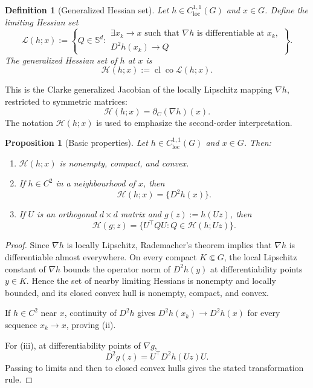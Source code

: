 \documentclass[11pt]{article}
\numberwithin{equation}{section}
\newtheorem{proposition}[theorem]{Proposition}
\newtheorem{definition}[theorem]{Definition}
\newcommand{\Sd}{\mathbb S^d}
\newcommand{\co}{\operatorname{co}}
\newcommand{\cl}{\operatorname{cl}}
\newcommand{\Hess}{\mathcal H}
\newcommand{\LimHess}{\mathcal L}
\begin{document}
	\begin{definition}[Generalized Hessian set]
		\label{def:hessian-set}
		Let \(h\in C^{1,1}_{\mathrm{loc}}(G)\) and \(x\in G\). Define the limiting Hessian set
		\[
		\LimHess(h;x)
		:=
		\left\{
		Q\in\Sd:
		\begin{array}{l}
			\exists x_k\to x \text{ such that } \nabla h \text{ is differentiable at }x_k,\\
			D^2h(x_k)\to Q
		\end{array}
		\right\}.
		\]
		The generalized Hessian set of \(h\) at \(x\) is
		\[
		\Hess(h;x)
		:=
		\cl\co \LimHess(h;x).
		\]
	\end{definition}
	
	This is the Clarke generalized Jacobian of the locally Lipschitz mapping \(\nabla h\), restricted to symmetric matrices:
	\[
	\Hess(h;x)=\partial_C(\nabla h)(x).
	\]
	The notation \(\Hess(h;x)\) is used to emphasize the second-order interpretation.
	
	\begin{proposition}[Basic properties]
		\label{prop:hessian-basic}
		Let \(h\in C^{1,1}_{\mathrm{loc}}(G)\) and \(x\in G\). Then:
		\begin{enumerate}[label=(\roman*)]
			\item \(\Hess(h;x)\) is nonempty, compact, and convex.
			\item If \(h\in C^2\) in a neighbourhood of \(x\), then
			\[
			\Hess(h;x)=\{D^2h(x)\}.
			\]
			\item If \(U\) is an orthogonal \(d\times d\) matrix and \(g(z):=h(Uz)\), then
			\[
			\Hess(g;z)
			=
			\{U^\top Q U: Q\in\Hess(h;Uz)\}.
			\]
		\end{enumerate}
	\end{proposition}
	
	\begin{proof}
		Since \(\nabla h\) is locally Lipschitz, Rademacher's theorem implies that \(\nabla h\) is differentiable almost everywhere. On every compact \(K\Subset G\), the local Lipschitz constant of \(\nabla h\) bounds the operator norm of \(D^2h(y)\) at differentiability points \(y\in K\). Hence the set of nearby limiting Hessians is nonempty and locally bounded, and its closed convex hull is nonempty, compact, and convex.
		
		If \(h\in C^2\) near \(x\), continuity of \(D^2h\) gives \(D^2h(x_k)\to D^2h(x)\) for every sequence \(x_k\to x\), proving (ii).
		
		For (iii), at differentiability points of \(\nabla g\),
		\[
		D^2g(z)=U^\top D^2h(Uz)U.
		\]
		Passing to limits and then to closed convex hulls gives the stated transformation rule.
	\end{proof}
	
\end{document}
